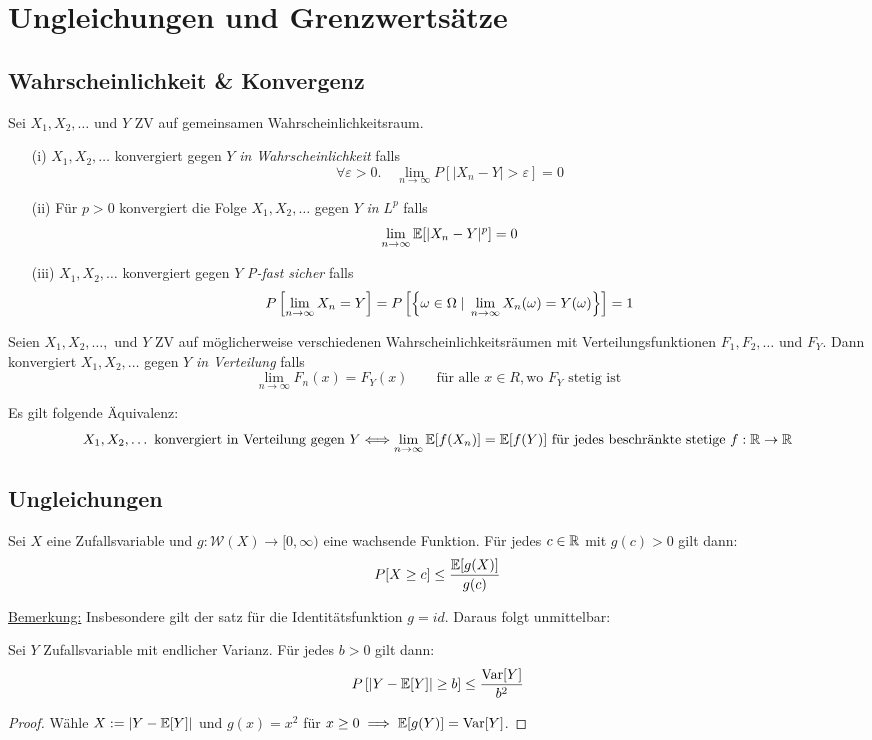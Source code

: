 \section{Ungleichungen und Grenzwertsätze}
\subsection{Wahrscheinlichkeit \& Konvergenz}
\begin{definition}
Sei $X_1,X_2,\dots$ und $Y$ ZV auf gemeinsamen Wahrscheinlichkeitsraum.
\begin{itemize}
\item[(i)] $X_1,X_2,\dots$ konvergiert gegen $Y$ \textit{in Wahrscheinlichkeit} falls $$\forall \varepsilon >0. \quad \lim_{n\to \infty} P[ |X_n -Y| > \varepsilon] = 0$$
\item[(ii)] Für $p>0$ konvergiert die Folge $X_1,X_2,\dots$ gegen $Y$ \textit{in} $L^p$ falls $$\lim_{n\to\infty} \mathbb{E}[ |X_n - Y|^p] = 0$$
\item[(iii)] $X_1,X_2,\dots$ konvergiert gegen $Y$ \textit{P-fast sicher} falls $$ P\left[ \lim_{n\to\infty} X_n = Y \right] = P \left[ \left \{ \omega \in \Omega \;|\; \lim_{n\to\infty} X_n(\omega) = Y(\omega) \right \} \right] = 1$$
\end{itemize}
\end{definition}

\begin{definition}
Seien $X_1,X_2,\dots,$ und $Y$ ZV auf möglicherweise verschiedenen Wahrscheinlichkeitsräumen mit Verteilungsfunktionen $F_1,F_2,\dots$ und $F_Y$. Dann konvergiert $X_1,X_2, \dots$ gegen $Y$ \textit{in Verteilung} falls
$$ \lim_{n\to\infty} F_n(x) = F_Y(x) \quad \quad \mbox{für alle } x\in R, \mbox{wo } F_Y \mbox{ stetig ist}$$
\end{definition}

\begin{satz}
Es gilt folgende Äquivalenz:
$$ X_1,X_2,\dots \mbox{ konvergiert in Verteilung gegen } Y \Longleftrightarrow \lim_{n\to\infty} \mathbb{E}[f(X_n)] = \mathbb{E}[f(Y)] \mbox{ für jedes beschränkte stetige } f:\mathbb{R}\to\mathbb{R}$$
\end{satz}
\subsection{Ungleichungen}
\begin{satz}
Sei $X$ eine Zufallsvariable und $g:\mathcal{W}(X)\to [0, \infty)$ eine wachsende Funktion. Für jedes $c \in \mathbb{R}$ mit $g(c) > 0$ gilt dann:
$$ P[X \geq c] \leq \frac{\mathbb{E}[g(X)]}{g(c)}$$
\end{satz}
\underline{Bemerkung:} Insbesondere gilt der satz für die Identitätsfunktion $g=id$. Daraus folgt unmittelbar:
\begin{satz}
Sei $Y$ Zufallsvariable mit endlicher Varianz. Für jedes $b>0$ gilt dann:
$$ P\left[ |Y-\mathbb{E}[Y]| \geq b \right] \leq \frac{\mathrm{Var}[Y]}{b^2}$$
\end{satz}
\begin{proof}
Wähle $X:=|Y-\mathbb{E}[Y]|$ und $g(x) =x^2 $ für $x\geq 0 \implies \mathbb{E}[g(Y)] = \mathrm{Var}[Y]$.
\end{proof}

